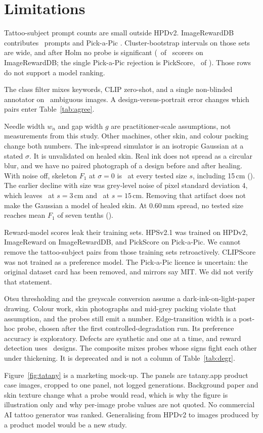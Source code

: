 \section{Limitations}
\label{sec:limitations}

Tattoo-subject prompt counts are small outside HPDv2.
ImageRewardDB contributes \NIrTsprompts\ prompts and Pick-a-Pic \NPapTsprompts.
Cluster-bootstrap intervals on those sets are wide, and after Holm no probe is significant (\NIrSigholm\ of \NIrTests\ scorers on ImageRewardDB; the single Pick-a-Pic rejection is PickScore, \NPapSigholm\ of \NPapTests).
Those rows do not support a model ranking.

The class filter mixes keywords, CLIP zero-shot, and a single non-blinded annotator on \nAmb\ ambiguous images.
A design-versus-portrait error changes which pairs enter Table~\ref{tab:agree}.

Needle width $w_n$ and gap width $g$ are practitioner-scale assumptions, not measurements from this study.
Other machines, other skin, and colour packing change both numbers.
The ink-spread simulator is an isotropic Gaussian at a stated $\sigma$.
It is unvalidated on healed skin.
Real ink does not spread as a circular blur, and we have no paired photograph of a design before and after healing.
With noise off, skeleton $F_1$ at $\sigma{=}0$ is \ssFoneSizeThreeSpreadZero\ at every tested size $s$, including 15\,cm (\ssFoneSizeFifteenSpreadZero).
The earlier decline with size was grey-level noise of pixel standard deviation 4, which leaves \ssNoiseFoneThree\ at $s{=}3$\,cm and \ssNoiseFoneFifteen\ at $s{=}15$\,cm.
Removing that artifact does not make the Gaussian a model of healed skin.
At 0.60\,mm spread, no tested size reaches mean $F_1$ of seven tenths (\minSizeSeventySpreadSixty).

Reward-model scores leak their training sets.
HPSv2.1 was trained on HPDv2, ImageReward on ImageRewardDB, and PickScore on Pick-a-Pic.
We cannot remove the tattoo-subject pairs from those training sets retroactively.
CLIPScore was not trained as a preference model.
The Pick-a-Pic licence is uncertain: the original dataset card has been removed, and mirrors say MIT.
We did not verify that statement.

Otsu thresholding and the greyscale conversion assume a dark-ink-on-light-paper drawing.
Colour work, skin photographs and mid-grey packing violate that assumption, and the probes still emit a number.
Edge-transition width is a post-hoc probe, chosen after the first controlled-degradation run.
Its preference accuracy is exploratory.
Defects are synthetic and one at a time, and reward detection uses \nDegrRewDesigns\ designs.
The composite mixes probes whose signs fight each other under thickening.
It is deprecated and is not a column of Table~\ref{tab:degr}.

Figure~\ref{fig:tatany} is a marketing mock-up.
The panels are tatany.app product case images, cropped to one panel, not logged generations.
Background paper and skin texture change what a probe would read, which is why the figure is illustration only and why per-image probe values are not quoted.
No commercial AI tattoo generator was ranked.
Generalising from HPDv2 to images produced by a product model would be a new study.
